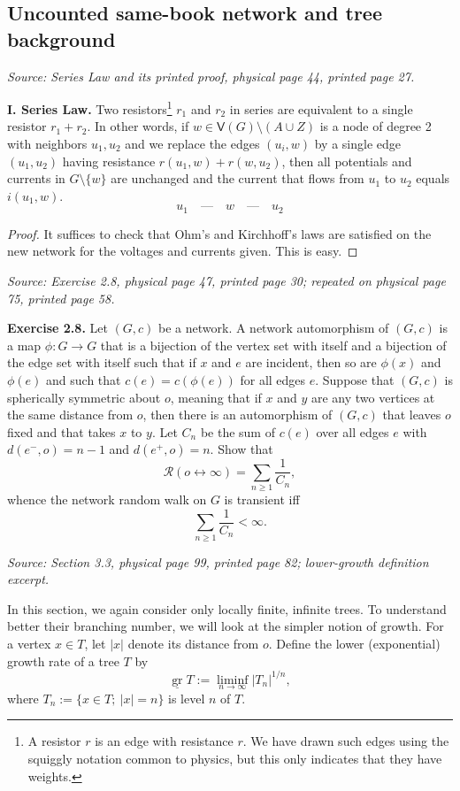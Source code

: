 \documentclass[11pt]{article}
\newcommand{\grlow}{\underline{\operatorname{gr}}}
\newcommand{\src}[1]{\par\smallskip\noindent\textit{Source: #1.}\par\nopagebreak[4]\smallskip}
\begin{document}
\subsection*{Uncounted same-book network and tree background}
\src{Series Law and its printed proof, physical page 44, printed page 27}
\noindent\textbf{I. Series Law.}
Two resistors\footnote{A resistor $r$ is an edge with resistance $r$.
We have drawn such edges using the squiggly notation common to physics,
but this only indicates that they have weights.}
$r_1$ and $r_2$ in series are equivalent to a single resistor $r_1+r_2$.
In other words, if $w\in\mathsf V(G)\setminus(A\cup Z)$ is a node of degree 2
with neighbors $u_1,u_2$ and we replace the edges $(u_i,w)$ by a single edge
$(u_1,u_2)$ having resistance $r(u_1,w)+r(w,u_2)$, then all potentials and
currents in $G\setminus\{w\}$ are unchanged and the current that flows from
$u_1$ to $u_2$ equals $i(u_1,w)$.
\[
u_1\quad\text{---}\quad w\quad\text{---}\quad u_2
\]
\begin{proof}
It suffices to check that Ohm's and Kirchhoff's laws are satisfied on the
new network for the voltages and currents given. This is easy.
\end{proof}

\src{Exercise 2.8, physical page 47, printed page 30; repeated on physical page 75, printed page 58}
\noindent\textbf{Exercise 2.8.}
Let $(G,c)$ be a network. A network automorphism of $(G,c)$ is a map
$\phi:G\to G$ that is a bijection of the vertex set with itself and a
bijection of the edge set with itself such that if $x$ and $e$ are incident,
then so are $\phi(x)$ and $\phi(e)$ and such that $c(e)=c(\phi(e))$ for all edges $e$.
Suppose that $(G,c)$ is spherically symmetric about $o$, meaning that if $x$
and $y$ are any two vertices at the same distance from $o$, then there is
an automorphism of $(G,c)$ that leaves $o$ fixed and that takes $x$ to $y$.
Let $C_n$ be the sum of $c(e)$ over all edges $e$ with $d(e^-,o)=n-1$
and $d(e^+,o)=n$. Show that
\[
\mathcal R(o\leftrightarrow\infty)=\sum_{n\geq1}\frac1{C_n},
\]
whence the network random walk on $G$ is transient iff
\[
\sum_{n\geq1}\frac1{C_n}<\infty.
\]

\src{Section 3.3, physical page 99, printed page 82; lower-growth definition excerpt}
In this section, we again consider only locally finite, infinite trees.
To understand better their branching number, we will look at the simpler
notion of growth. For a vertex $x\in T$, let $|x|$ denote its distance from $o$.
Define the lower (exponential) growth rate of a tree $T$ by
\[
\grlow T:=\liminf_{n\to\infty}|T_n|^{1/n},
\]
where $T_n:=\{x\in T;\ |x|=n\}$ is level $n$ of $T$.
\end{document}
